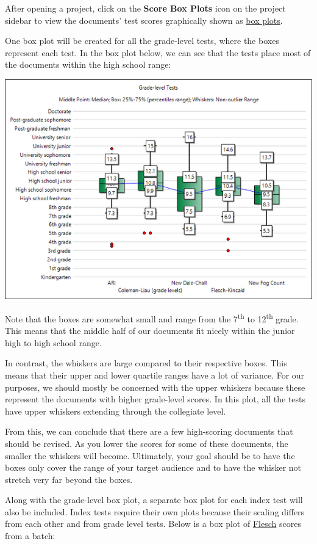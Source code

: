 \documentclass[
]{book}
\theoremstyle{definition}
\theoremstyle{definition}
\theoremstyle{definition}
\theoremstyle{definition}
\theoremstyle{remark}
\begin{document}
After opening a project, click on the \textbf{Score Box Plots} icon on the project sidebar to view the documents' test scores graphically shown as \protect\hyperlink{boxplot}{box plots}.

One box plot will be created for all the grade-level tests, where the boxes represent each test. In the box plot below, we can see that the tests place most of the documents within the high school range:

\begin{center}\includegraphics[width=0.75\linewidth,]{Images/boxgrades} \end{center}

Note that the boxes are somewhat small and range from the 7\textsuperscript{th} to 12\textsuperscript{th} grade. This means that the middle half of our documents fit nicely within the junior high to high school range.

In contrast, the whiskers are large compared to their respective boxes. This means that their upper and lower quartile ranges have a lot of variance. For our purposes, we should mostly be concerned with the upper whiskers because these represent the documents with higher grade-level scores. In this plot, all the tests have upper whiskers extending through the collegiate level.

From this, we can conclude that there are a few high-scoring documents that should be revised. As you lower the scores for some of these documents, the smaller the whiskers will become. Ultimately, your goal should be to have the boxes only cover the range of your target audience and to have the whisker not stretch very far beyond the boxes.

Along with the grade-level box plot, a separate box plot for each index test will also be included. Index tests require their own plots because their scaling differs from each other and from grade level tests. Below is a box plot of \protect\hyperlink{flesch-test}{Flesch} scores from a batch:
\end{document}
